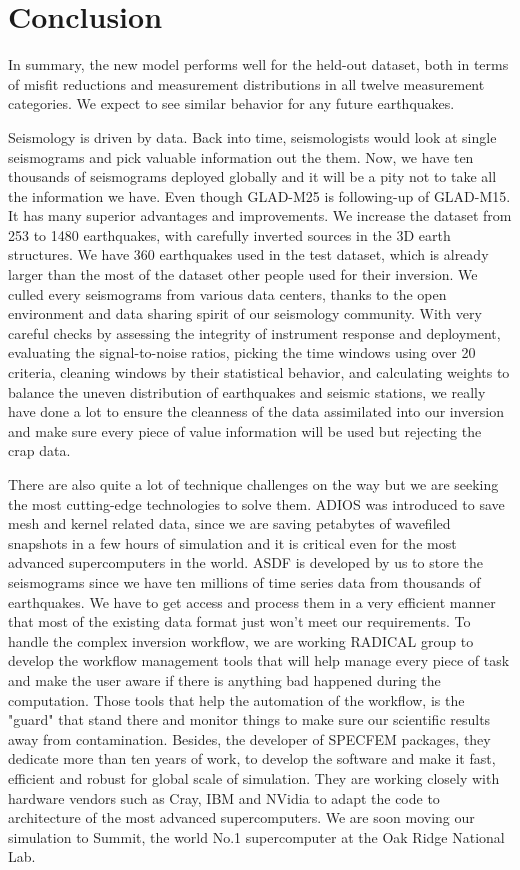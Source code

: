 \documentclass[extra,mreferee]{gji}
\begin{document}
\newpage


\section{Conclusion}

In summary,
the new model performs well for the held-out dataset, both in terms of misfit reductions and measurement distributions in all twelve measurement categories.
We expect to see similar behavior for any future earthquakes.


Seismology is driven by data. Back into time, seismologists would look at
single seismograms and pick valuable information out the them. Now, we have
ten thousands of seismograms deployed globally and it will be a pity not
to take all the information we have. Even though GLAD-M25 is following-up
of GLAD-M15. It has many superior advantages and improvements. We increase
the dataset from 253 to 1480 earthquakes, with carefully inverted sources
in the 3D earth structures. We have 360 earthquakes used in the test
dataset, which is already larger than the most of the dataset other people used
for their inversion. We culled every seismograms from various data centers,
thanks to the open environment and data sharing spirit of our seismology community.
With very careful checks by assessing the integrity of instrument response
and deployment, evaluating the signal-to-noise ratios, picking the time windows
using over 20 criteria, cleaning windows by their statistical behavior, and
calculating weights to balance the uneven distribution of earthquakes and
seismic stations, we really have done a lot to ensure the cleanness of the
data assimilated into our inversion and make sure every piece of value information
will be used but rejecting the crap data.

There are also quite a lot of technique challenges on the way but we are seeking
the most cutting-edge technologies to solve them. ADIOS was introduced to save mesh
and kernel related data, since we are saving petabytes of wavefiled snapshots
in a few hours of simulation and it is critical even for the most advanced
supercomputers in the world. ASDF is developed by us to store the seismograms
since we have ten millions of time series data from thousands of earthquakes.
We have to get access and process them in a very efficient manner that most of
the existing data format just won't meet our requirements. To handle the complex
inversion workflow, we are working RADICAL group to develop the workflow management
tools that will help manage every piece of task and make the user aware if there
is anything bad happened during the computation. Those tools that help the
automation of the workflow, is the "guard" that stand there and monitor things
to make sure our scientific results away from contamination. Besides, the
developer of SPECFEM packages, they dedicate more than ten years of work,
to develop the software and make it fast, efficient and robust for global scale of simulation.
They are working closely with hardware vendors such as Cray, IBM and NVidia to adapt
the code to architecture of the most advanced supercomputers. We are soon
moving our simulation to Summit, the world No.1 supercomputer at the Oak Ridge
National Lab.
\end{document}
